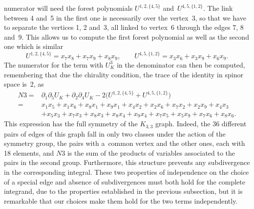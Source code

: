 \documentclass[pdftex]{sigma}
\numberwithin{equation}{section}
\begin{document}
numerator will need the forest polynomials $U^{1,2,\{4,5\}}$ and~$U^{4,5,\{1,2\}}$. The link between 4 and~5 in the
first one is necessarily over the vertex~3, so that we have to separate the vertices 1, 2 and~3, all linked to vertex~6
through the edges 7, 8 and~9. This allows us to compute the first forest polynomial as well as the second one which is similar
\[
	U^{1,2,\{4,5\}} = x_7 x_8 + x_7 x_9 + x_8 x_9, \qquad
	U^{4,5,\{1,2\}} = x_3 x_6 + x_3 x_9 + x_6 x_9.
\]
The numerator for the term with $U_K^3$ in the denominator can then be computed, remembering that due the chirality
condition, the trace of the identity in spinor space is~2, as
\begin{align*}
	N3 ={}& \partial_1 \partial_5 U_K + \partial_2 \partial_4 U_K - 2\bigl( U^{1,2,\{4,5\}} + U^{4,5,\{1,2\}}\bigr)
	 \\
		={}& x_1x_5+x_1x_6+x_8x_1+x_9x_1+x_4x_2+x_2x_6+x_7x_2+x_2x_9+x_4x_3 \\
		& +x_5x_3+x_7x_3+x_8x_3+x_8x_4+x_9x_4+x_7x_5+x_5x_9+x_7x_6+x_8x_6.
\end{align*}
This expression has the full symmetry of the $K_{3,3}$ graph. Indeed, the 36 different
pairs of edges of this graph fall in only two classes under the action of the symmetry group, the pairs with a~common
vertex and the other ones, each with 18 elements, and $N3$ is the sum of the products of variables associated to the
pairs in the second group. Furthermore, this structure prevents any subdivergence in the corresponding integral. These two
properties of independence on the choice of a special edge and absence of subdivergences must both hold for the complete
integrand, due to the properties established in the previous subsection, but it is remarkable that our choices make them hold for the two terms independently.
\end{document}
